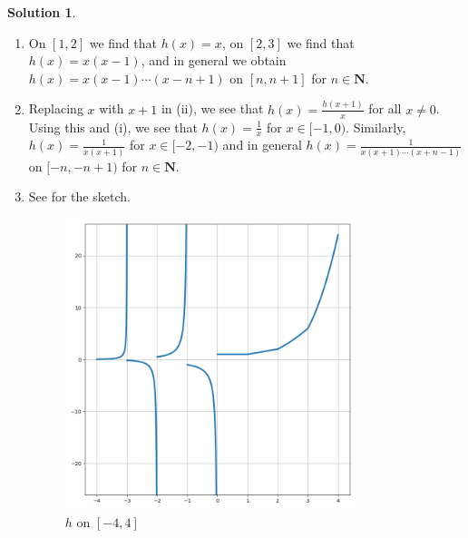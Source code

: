\documentclass[12pt]{article}
\theoremstyle{definition}
\theoremstyle{exercise}
\theoremstyle{solution}
\newtheorem*{solution}{Solution}
\newcommand{\N}{\mathbf{N}}
\begin{document}
\begin{solution}
    \begin{enumerate}
        \item On \( [1, 2] \) we find that \( h(x) = x \), on \( [2, 3] \) we find that \( h(x) = x(x - 1) \), and in general we obtain \( h(x) = x(x - 1) \cdots (x - n + 1) \) on \( [n, n + 1] \) for \( n \in \N \).

        \item Replacing \( x \) with \( x + 1 \) in (ii), we see that \( h(x) = \frac{h(x + 1)}{x} \) for all \( x \neq 0 \). Using this and (i), we see that \( h(x) = \tfrac{1}{x} \) for \( x \in [-1, 0) \). Similarly, \( h(x) = \tfrac{1}{x(x + 1)} \) for \( x \in [-2, -1) \) and in general \( h(x) = \tfrac{1}{x(x + 1) \cdots (x + n - 1)} \) on \( [-n, -n + 1) \) for \( n \in \N \).

        \item See  for the sketch.
        \begin{figure}[H]
            \centering
            \includegraphics[width=0.8\textwidth]{UA_Section_8_4_Figure_1.png}
            \caption{\( h \) on \( [-4, 4] \)}
            \label{fig:1}
        \end{figure}
    \end{enumerate}
\end{solution}
\end{document}
